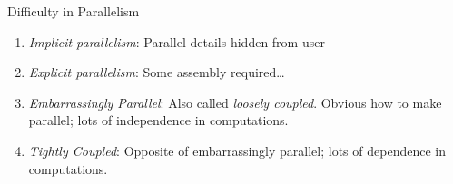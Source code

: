 








\begin{frame}
  \begin{block}{Difficulty in Parallelism}
  \begin{enumerate}[<+-|alert@+>]
    \item \emph{Implicit parallelism}:  Parallel details hidden from user
    \item \emph{Explicit parallelism}:  Some assembly required\dots
    \item \emph{Embarrassingly Parallel}:  Also called \emph{loosely coupled}.  
Obvious how to make parallel; lots of independence in computations.
    \item \emph{Tightly Coupled}:  Opposite of embarrassingly parallel; lots of 
dependence in computations.
  \end{enumerate}  
  \end{block}
\end{frame}


